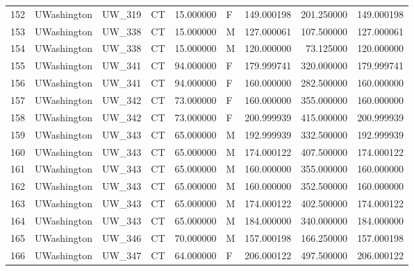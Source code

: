 \begin{tabular}{llllrlrrr}
152    &     UWashington &       UW\_319 &                 CT &  15.000000 &        F &       149.000198 &    201.250000 &  149.000198 \\
153    &     UWashington &       UW\_338 &                 CT &  15.000000 &        M &       127.000061 &    107.500000 &  127.000061 \\
154    &     UWashington &       UW\_338 &                 CT &  15.000000 &        M &       120.000000 &     73.125000 &  120.000000 \\
155    &     UWashington &       UW\_341 &                 CT &  94.000000 &        F &       179.999741 &    320.000000 &  179.999741 \\
156    &     UWashington &       UW\_341 &                 CT &  94.000000 &        F &       160.000000 &    282.500000 &  160.000000 \\
157    &     UWashington &       UW\_342 &                 CT &  73.000000 &        F &       160.000000 &    355.000000 &  160.000000 \\
158    &     UWashington &       UW\_342 &                 CT &  73.000000 &        F &       200.999939 &    415.000000 &  200.999939 \\
159    &     UWashington &       UW\_343 &                 CT &  65.000000 &        M &       192.999939 &    332.500000 &  192.999939 \\
160    &     UWashington &       UW\_343 &                 CT &  65.000000 &        M &       174.000122 &    407.500000 &  174.000122 \\
161    &     UWashington &       UW\_343 &                 CT &  65.000000 &        M &       160.000000 &    355.000000 &  160.000000 \\
162    &     UWashington &       UW\_343 &                 CT &  65.000000 &        M &       160.000000 &    352.500000 &  160.000000 \\
163    &     UWashington &       UW\_343 &                 CT &  65.000000 &        M &       174.000122 &    402.500000 &  174.000122 \\
164    &     UWashington &       UW\_343 &                 CT &  65.000000 &        M &       184.000000 &    340.000000 &  184.000000 \\
165    &     UWashington &       UW\_346 &                 CT &  70.000000 &        M &       157.000198 &    166.250000 &  157.000198 \\
166    &     UWashington &       UW\_347 &                 CT &  64.000000 &        F &       206.000122 &    497.500000 &  206.000122 \\

\end{tabular}
